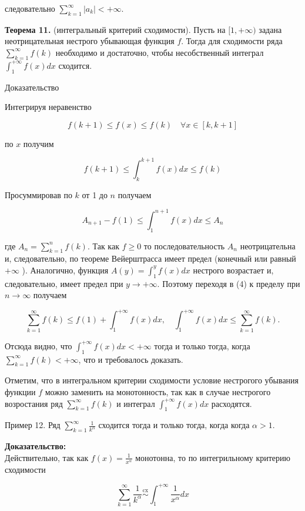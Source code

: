 \documentclass[a4paper,12pt]{article} %
\begin{document}
	следовательно $\sum_{k=1}^{\infty}\left|a_{k}\right|<+\infty$.
	
	\textbf{Теорема 11.} (интегральный критерий сходимости). Пусть на $[1,+\infty)$ задана неотрицательная нестрого убывающая функция $f$. Тогда для сходимости ряда $\sum_{k=1}^{\infty} f(k)$ необходимо и достаточно, чтобы несобственный интеграл $\int_{1}^{+\infty} f(x) d x$ сходится.
	
	Доказательство
	
	Интегрируя неравенство
	
	$$
	f(k+1) \leq f(x) \leq f(k) \quad \forall x \in[k, k+1]
	$$
	
	по $x$ получим
	
	$$
	f(k+1) \leq \int_{k}^{k+1} f(x) d x \leq f(k)
	$$
	
	Просуммировав по $k$ от 1 до $n$ получаем
	
	$$
	A_{n+1}-f(1) \leq \int_{1}^{n+1} f(x) d x \leq A_{n}
	$$
	
	где $A_{n}=\sum_{k=1}^{n} f(k)$. Так как $f \geq 0$ то последовательность $A_{n}$ неотрицательна и, следовательно, по теореме Вейерштрасса имеет предел (конечный или равный $+\infty$ ). Аналогично, функция $A(y)=\int_{1}^{y} f(x) d x$ нестрого возрастает и, следовательно, имеет предел при $y \rightarrow+\infty$. Поэтому переходя в (4) к пределу при $n \rightarrow \infty$ получаем
	
	$$
	\sum_{k=1}^{\infty} f(k) \leq f(1)+\int_{1}^{+\infty} f(x) d x, \quad \int_{1}^{+\infty} f(x) d x \leq \sum_{k=1}^{\infty} f(k) .
	$$
	
	Отсюда видно, что $\int_{1}^{+\infty} f(x) d x<+\infty$ тогда и только тогда, когда $\sum_{k=1}^{\infty} f(k)<+\infty$, что и требовалось доказать.
	
	Отметим, что в интегральном критерии сходимости условие нестрогого убывания функции $f$ можно заменить на монотонность, так как в случае нестрогого возростания ряд $\sum_{k=1}^{\infty} f(k)$ и интеграл $\int_{1}^{+\infty} f(x) d x$ расходятся.
	
	Пример 12. Ряд $\sum_{k=1}^{\infty} \frac{1}{k^{\alpha}}$ сходится тогда и только тогда, когда когда $\alpha>1$.
	
	\textbf{Доказательство:\\}
	Действительно, так как $f(x)=\frac{1}{x^{\alpha}}$ монотонна, то по интегрильному критерию сходимости
	
	$$
	\sum_{k=1}^{\infty} \frac{1}{k^{\alpha}} \stackrel{\mathrm{cx}}{\sim} \int_{1}^{+\infty} \frac{1}{x^{\alpha}} d x
	$$
	
\end{document}
